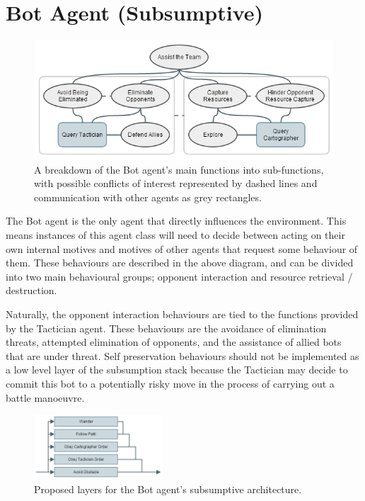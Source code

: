 \documentclass[a4paper,10pt]{article}
\begin{document}
\newpage
\section{Bot Agent (Subsumptive)}
\begin{figure}[!ht]
  \centering
  \includegraphics[width=0.8\linewidth]{bot}
  \begin{minipage}[t]{0.8\textwidth}
    \caption{A breakdown of the Bot agent's main functions into sub-functions, with possible conflicts of interest represented by dashed lines and communication with other agents as grey rectangles.}
  \end{minipage}
\end{figure}

The Bot agent is the only agent that directly influences the environment. This means instances of this agent class will need to decide between acting on their own internal motives and motives of other agents that request some behaviour of them. These behaviours are described in the above diagram, and can be divided into two main behavioural groups; opponent interaction and resource retrieval / destruction.

Naturally, the opponent interaction behaviours are tied to the functions provided by the Tactician agent. These behaviours are the avoidance of elimination threats, attempted elimination of opponents, and the assistance of allied bots that are under threat. Self preservation behaviours should not be implemented as a low level layer of the subsumption stack because the Tactician may decide to commit this bot to a potentially risky move in the process of carrying out a battle manoeuvre.

\begin{figure}
  \vspace{-5mm}
  \begin{center}
    \includegraphics[width=0.43\textwidth]{subsumptive}
    \caption{Proposed layers for the Bot agent's subsumptive architecture.}
  \end{center}
  \vspace{-5mm}
\end{figure}
\end{document}
